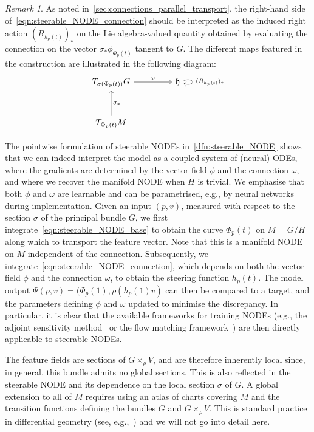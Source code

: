 \documentclass[12pt,a4paper]{article}
\numberwithin{equation}{section}
\theoremstyle{plain}
\theoremstyle{definition}
\theoremstyle{remark}
\newtheorem{remark}[theorem]{Remark}
\begin{document}
\begin{remark}
As noted in~\cref{sec:connections_parallel_transport}, the right-hand side of~\eqref{eqn:steerable_NODE_connection} should be interpreted as the induced right action $(R_{h_p(t)})_*$ on the Lie algebra-valued quantity obtained by evaluating the connection on the vector $\sigma_*\phi_{\Phi_p(t)}$ tangent to $G$. The different maps featured in the construction are illustrated in the following diagram:
\[
\begin{tikzcd}[column sep=4.5em, row sep=3em]
    T_{\sigma(\Phi_p(t))}G 
        \arrow[r, "\omega"] 
    & \mathfrak{h}
        \arrow[out=10, in=170, loop right, "\,(R_{h_p(t)})_*\,"] \\
    T_{\Phi_p(t)}M 
        \arrow[u, "\sigma_*"']
\end{tikzcd}
\]
\end{remark}

The pointwise formulation of steerable NODEs in~\cref{dfn:steerable_NODE} shows that we can indeed interpret the model as a coupled system of (neural) ODEs, where the gradients are determined by the vector field $\phi$ and the connection $\omega$, and where we recover the manifold NODE when $H$ is trivial. We emphasise that both $\phi$ and $\omega$ are learnable and can be parametrised, e.g., by neural networks during implementation. Given an input $(p,v)$, measured with respect to the section $\sigma$ of the principal bundle $G$, we first integrate~\eqref{eqn:steerable_NODE_base} to obtain the curve $\Phi_p(t)$ on $M=G/H$ along which to transport the feature vector. Note that this is a manifold NODE on $M$ independent of the connection. Subsequently, we integrate~\eqref{eqn:steerable_NODE_connection}, which depends on both the vector field $\phi$ and the connection $\omega$, to obtain the steering function $h_p(t)$. The model output $\Psi(p,v) = (\Phi_p(1),\rho(h_p(1)v)$ can then be compared to a target, and the parameters defining $\phi$ and $\omega$ updated to minimise the discrepancy. In particular, it is clear that the available frameworks for training NODEs (e.g., the adjoint sensitivity method~\cite{Chen2018} or the flow matching framework~\cite{Lipman2023}) are then directly applicable to steerable NODEs.

The feature fields are sections of $G \times_{\rho} V$, and are therefore inherently local since, in general, this bundle admits no global sections. This is also reflected in the steerable NODE and its dependence on the local section $\sigma$ of $G$. A global extension to all of $M$ requires using an atlas of charts covering $M$ and the transition functions defining the bundles $G$ and $G \times_{\rho} V$. This is standard practice in differential geometry (see, e.g.,~\cite{Nakahara2003,Lee2012}) and we will not go into detail here. 
\end{document}

